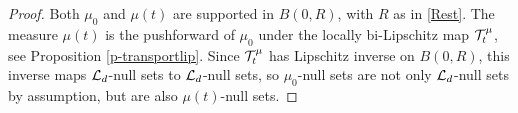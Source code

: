 \begin{proof}
Both $\mu_0$ and $\mu(t)$ are supported in $B(0,R)$, with $R$ as in \eqref{Rest}. The measure $\mu(t)$ is the pushforward of $\mu_0$ under the locally bi-Lipschitz map $\mathcal{T}^\mu_t$, see Proposition \ref{p-transportlip}. Since $\mathcal{T}^\mu_t$ has Lipschitz inverse on $B(0,R)$, this inverse maps $\mathcal{L}_d$-null sets to $\mathcal{L}_d$-null sets, so $\mu_0$-null sets are not only $\mathcal{L}_d$-null sets by assumption, but are also $\mu(t)$-null sets.
\end{proof}
%
